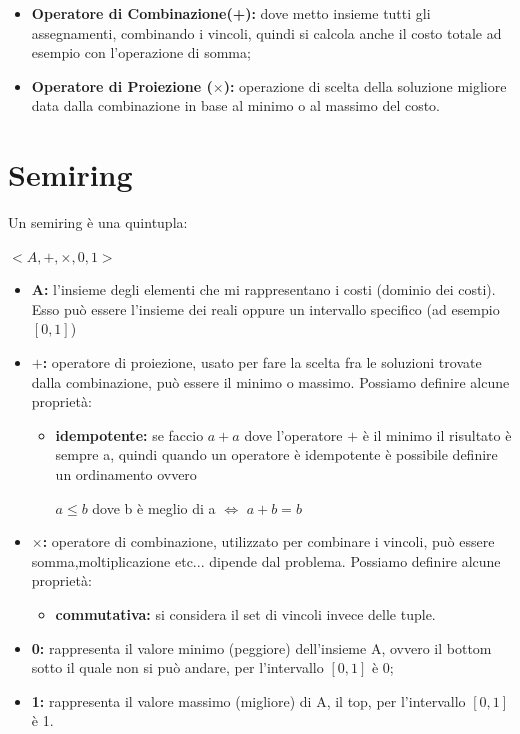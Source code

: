 \begin{itemize}
    \item \textbf{Operatore di Combinazione(+):} dove metto insieme tutti gli
          assegnamenti, combinando i vincoli, quindi si calcola anche il costo totale
          ad esempio con l'operazione di somma;
    \item \textbf{Operatore di Proiezione ($\times$):} operazione di scelta della
          soluzione migliore data dalla combinazione in base al minimo o al massimo
          del costo.
\end{itemize}

\section{Semiring}
Un semiring è una quintupla:
\begin{center}
    $<A, +, \times, 0, 1>$
\end{center}
\begin{itemize}
    \item \textbf{A:} l'insieme degli elementi che mi rappresentano i costi
          (dominio dei costi). Esso può essere l'insieme dei reali oppure un
          intervallo specifico (ad esempio $[0,1]$)
    \item \textbf{$+$:} operatore di proiezione, usato per fare la scelta fra le
          soluzioni trovate dalla combinazione, può essere il minimo o massimo.
          Possiamo definire alcune proprietà:
          \begin{itemize}
              \item \textbf{idempotente:} se faccio $a+a$ dove l'operatore $+$ è il
                    minimo il risultato è sempre a, quindi quando un operatore è
                    idempotente è possibile definire un ordinamento ovvero
                    \begin{center}
                        $a \leq b$ dove b è meglio di a $\Longleftrightarrow$
                        $a + b = b$
                    \end{center}
          \end{itemize}
    \item \textbf{$\times$:} operatore di combinazione, utilizzato per combinare i
          vincoli, può essere somma,moltiplicazione etc... dipende dal problema.
          Possiamo definire alcune proprietà:
          \begin{itemize}
              \item \textbf{commutativa:} si considera il set di vincoli invece
                    delle tuple.
          \end{itemize}
    \item \textbf{0:} rappresenta il valore minimo (peggiore) dell'insieme A,
          ovvero il bottom sotto il quale non si può andare, per l'intervallo $[0,1]$
          è 0;
    \item \textbf{1:} rappresenta il valore massimo (migliore) di A, il top, per
          l'intervallo $[0,1]$ è 1.
\end{itemize}
